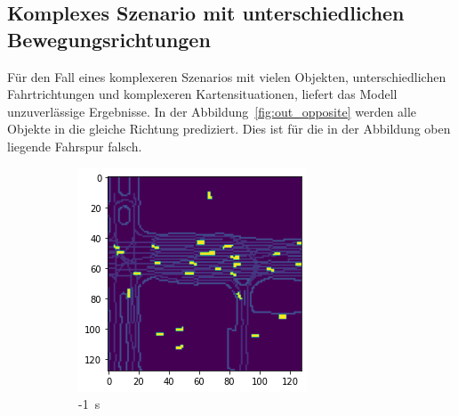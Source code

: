 \documentclass[12pt]{article}
\begin{document}
    \pagebreak
    \subsection{Komplexes Szenario mit unterschiedlichen Bewegungsrichtungen} 
        Für den Fall eines komplexeren Szenarios mit vielen Objekten, unterschiedlichen Fahrtrichtungen und komplexeren Kartensituationen, liefert das Modell unzuverlässige Ergebnisse.
        In der Abbildung~\ref{fig:out_opposite} werden alle Objekte in die gleiche Richtung prediziert. Dies ist für die in der Abbildung oben liegende Fahrspur falsch.

        \begin{figure}[H]
            \centering
            \begin{subfigure}[b]{0.18\textwidth}
                \includegraphics[width=\textwidth]{output_opposite_0.png}
                \caption{-1~s}
            \end{subfigure}
            ~
            \begin{subfigure}[b]{0.18\textwidth}

\end{subfigure}
\end{figure}
\end{document}
